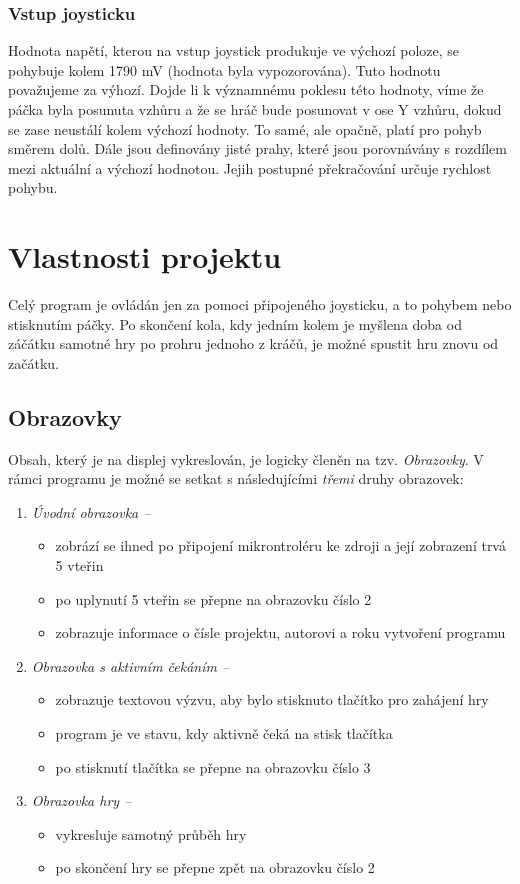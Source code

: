 \documentclass[a4paper, 11pt]{article}
\begin{document}
\subsubsection{Vstup joysticku}
Hodnota napětí, kterou na vstup joystick produkuje ve výchozí poloze, se pohybuje kolem 1790 mV (hodnota byla vypozorována). Tuto hodnotu považujeme za výhozí.
Dojde li k významnému
poklesu této hodnoty, víme že páčka byla posunuta vzhůru a že se hráč bude posunovat v ose Y vzhůru, dokud se zase neustálí kolem výchozí hodnoty. To samé, ale opačně, platí
pro pohyb směrem dolů. Dále jsou definovány jisté prahy, které jsou porovnávány s rozdílem mezi aktuální a výchozí hodnotou. Jejih postupné překračování určuje rychlost
pohybu.

\newpage

\section{Vlastnosti projektu}
Celý program je ovládán jen za pomoci připojeného joysticku, a to pohybem nebo stisknutím páčky. Po skončení kola, kdy jedním kolem je myšlena doba od záčátku
samotné hry po prohru jednoho z kráčů, je možné spustit hru znovu od začátku.

\subsection{Obrazovky}
Obsah, který je na displej vykreslován, je logicky členěn na tzv. \emph{Obrazovky}. V rámci programu je možné se setkat s následujícími \emph{třemi} druhy obrazovek:
\begin{enumerate}
    \item {\emph{Úvodní obrazovka --}}
    \begin{itemize}
        \item {zobrází se ihned po připojení mikrontroléru ke zdroji a její zobrazení trvá 5 vteřin}
        \item {po uplynutí 5 vteřin se přepne na obrazovku číslo 2}
        \item {zobrazuje informace o čísle projektu, autorovi a roku vytvoření programu}
    \end{itemize}
    \item {\emph{Obrazovka s aktivním čekáním --}}
    \begin{itemize}
        \item {zobrazuje textovou výzvu, aby bylo stisknuto tlačítko pro zahájení hry}
        \item {program je ve stavu, kdy aktivně čeká na stisk tlačítka}
        \item {po stisknutí tlačítka se přepne na obrazovku číslo 3}
    \end{itemize}
    \item {\emph{Obrazovka hry --}}
    \begin{itemize}
        \item {vykresluje samotný průběh hry}
        \item {po skončení hry se přepne zpět na obrazovku číslo 2}
    \end{itemize}
\end{enumerate}
\end{document}
